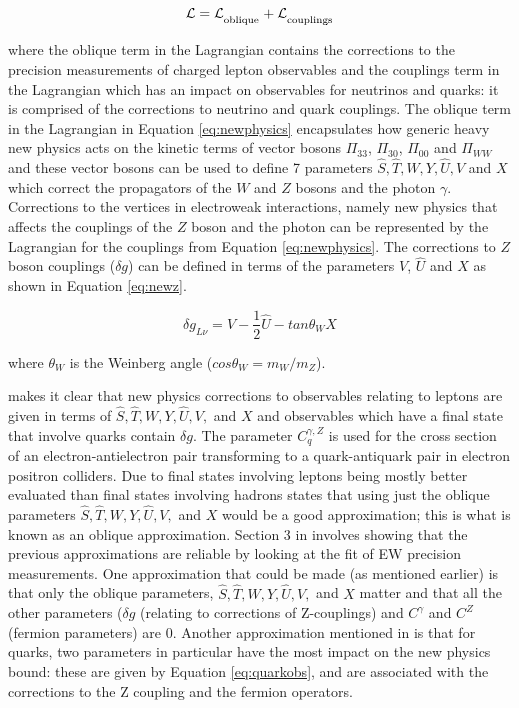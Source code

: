 \documentclass[11pt,oneside,a4paper]{article}
\begin{document}
\begin{equation}
\label{eq:newphysics}
\mathrm{\mathcal{L} = \mathcal{L_\textsubscript{oblique}} +\mathcal{L_\textsubscript{couplings}}}
\end{equation}


where the oblique term in the Lagrangian contains the corrections to the precision measurements of charged lepton observables and the couplings term in the Lagrangian which has an impact on observables for neutrinos and quarks: it is comprised of the corrections to neutrino and quark couplings. The oblique term in the Lagrangian in Equation \ref{eq:newphysics} encapsulates how generic heavy new physics acts on the kinetic terms of vector bosons $\Pi_{33}$, $\Pi_{30}$, $\Pi_{00}$ and $\Pi_{WW}$ and these vector bosons can be used to define 7 parameters $\hat{S}, \hat{T}, W, Y, \hat{U}, V$ and $X$ which correct the propagators of the $W$ and $Z$ bosons and the photon $\gamma$. Corrections to the vertices in electroweak interactions, namely new physics that affects the couplings of the $Z$ boson and the photon can be represented by the Lagrangian for the couplings from Equation \ref{eq:newphysics}. The corrections to $Z$ boson couplings ($\delta g$) can be defined in terms of the parameters $V$, $\hat{U}$ and $X$ as shown in Equation \ref{eq:newz}.




\begin{equation}
\label{eq:newz}
\delta g_{L\nu} = V - \frac{1}{2}\hat{U} - tan\theta_{W}X
\end{equation}

where $\theta_{W}$ is the Weinberg angle ($cos\theta_{W} = m_W/m_Z$).

\cite{EWprecision} makes it clear that new physics corrections to observables relating to leptons are given in terms of $\hat{S}, \hat{T}, W, Y, \hat{U}, V,$ and $X$ and observables which have a final state that involve quarks contain $\delta g$. The parameter $C^{\gamma,Z}_{q}$ is used for the cross section of an electron-antielectron pair transforming to a quark-antiquark pair in electron positron colliders. Due to final states involving leptons being mostly better evaluated than final states involving hadrons \cite{EWprecision} states that using just the oblique parameters $\hat{S}, \hat{T}, W, Y, \hat{U}, V,$ and $X$ would be a good approximation; this is what is known as an oblique approximation. 
Section 3 in \cite{EWprecision} involves showing that the previous approximations are reliable by looking at the fit of EW precision measurements. One approximation that could be made (as mentioned earlier) is that only the oblique parameters,  $\hat{S}, \hat{T}, W, Y, \hat{U}, V,$ and $X$ matter and that all the other parameters ($\delta g$ (relating to corrections of Z-couplings) and $C^{\gamma}$ and $C^{Z}$ (fermion parameters) are 0. Another approximation mentioned in \cite{EWprecision} is that for quarks, two parameters in particular have the most impact on the new physics bound: these are given by Equation \ref{eq:quarkobs}, and are associated with the corrections to the Z coupling and the fermion operators.
\end{document}
